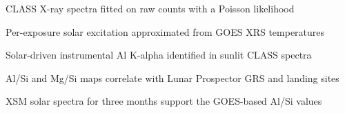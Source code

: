 \item CLASS X-ray spectra fitted on raw counts with a Poisson likelihood
\item Per-exposure solar excitation approximated from GOES XRS temperatures
\item Solar-driven instrumental Al K-alpha identified in sunlit CLASS spectra
\item Al/Si and Mg/Si maps correlate with Lunar Prospector GRS and landing sites
\item XSM solar spectra for three months support the GOES-based Al/Si values
